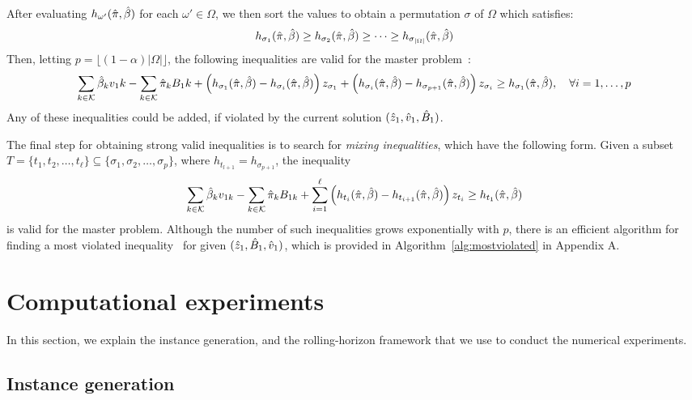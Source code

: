 \documentclass[11pt]{article}
\newcommand{\ka}{k} %
\newcommand{\KA}{\mathcal{K}}
\newcommand{\Bi}{B} %
\newcommand{\Vi}{v} %
\newcommand{\Zed}{z} %
\newcommand{\m}{\omega} %
\newcommand{\EM}{\Omega} %
\begin{document}
After evaluating $h_{\m'}(\pisol,\betasol)$ for each $\m' \in \EM$, we then sort the values to obtain a permutation $\sigma$ of $\EM$ which satisfies:
\[ h_{\sigma_1}(\pisol,\betasol) \geq h_{\sigma_2}(\pisol,\betasol)  \geq \cdots \geq h_{\sigma_{|\EM|}}(\pisol,\betasol)
 \]
Then, letting $p = \lfloor (1-\alpha) |\EM| \rfloor$, the following inequalities are valid for the master problem~\cite{luedtke2014branch}:
\[ \sum_{\ka  \in \KA} \betasol_k \Vi_1k - \sum_{\ka  \in \KA} \pisol_k \Bi_1k + 
\left(h_{\sigma_1}(\pisol,\betasol) - h_{\sigma_i}(\pisol,\betasol)\right)\Zed_{\sigma_1} + 
\left(h_{\sigma_i}(\pisol,\betasol) - h_{\sigma_{p+1}}(\pisol,\betasol)\right)\Zed_{\sigma_i} \geq h_{\sigma_1}(\pisol,\betasol), \quad \forall i=1,\ldots, p \]
Any of these inequalities could be added, if violated by the current solution $(\zsol_1,\vsol_1,\bsol_1)$.

The final step for obtaining strong valid inequalities is to search for {\it mixing inequalities}, which have the following form. Given a subset $T = \{t_1,t_2,\ldots,t_{\ell}\} \subseteq \{\sigma_1,\sigma_2,\ldots,\sigma_p\}$, where $h_{t_{l+1}}= h_{\sigma_{p+1}}$, the inequality
\[  \sum_{\ka  \in \KA} \betasol_k \Vi_{1k} - \sum_{\ka  \in \KA} \pisol_k \Bi_{1k} + 
\sum_{i=1}^{\ell} \left(h_{t_i}(\pisol,\betasol) - h_{t_{i+1}}(\pisol,\betasol)\right)\Zed_{t_i}
\geq  h_{t_1}(\pisol,\betasol) \]
is valid for the master problem. Although the number of such inequalities grows exponentially with $p$, there is an efficient algorithm for finding a most violated inequality~\cite{gunluk2001mixing} for given $(\zsol_1,\bsol_1,\vsol_1)$, which is provided in Algorithm~\ref{alg:mostviolated} in Appendix A. 




  

\section{Computational experiments}
In this section, we explain the instance generation, and the rolling-horizon framework that we use to conduct the numerical experiments. 
\subsection{Instance generation}
\end{document}
